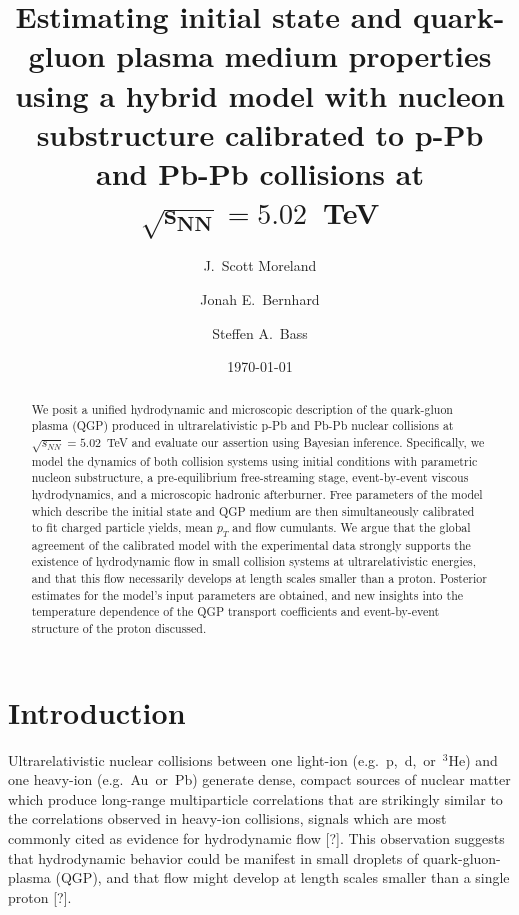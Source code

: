 \documentclass[aps,prc,reprint,amsmath,nofootinbib]{revtex4-1}
\newcommand{\sqrts}{\sqrt{s_{NN}}}
\newcommand{\note}{\textcolor{theblue}{[?]}}
\def\\#1{ #1}
\begin{document}
\title{
  Estimating initial state and quark-gluon plasma medium properties\\
  using a hybrid model with nucleon substructure\\
  calibrated to p-Pb and Pb-Pb collisions at \texorpdfstring{$\mathbf{\sqrts=5.02}$}{}~TeV
}

\author{J.\ Scott Moreland}
\author{Jonah E.\ Bernhard}
\author{Steffen A.\ Bass}


\date{\today}

\begin{abstract}
  We posit a unified hydrodynamic and microscopic description of the quark-gluon plasma (QGP) produced in ultrarelativistic p-Pb and Pb-Pb nuclear collisions at $\sqrts=5.02$~TeV and evaluate our assertion using Bayesian inference. Specifically, we model the dynamics of both collision systems using initial conditions with parametric nucleon substructure, a pre-equilibrium free-streaming stage, event-by-event viscous hydrodynamics, and a microscopic hadronic afterburner.
Free parameters of the model which describe the initial state and QGP medium are then simultaneously calibrated to fit charged particle yields, mean $p_T$ and flow cumulants.
We argue that the global agreement of the calibrated model with the experimental data strongly supports the existence of hydrodynamic flow in small collision systems at ultrarelativistic energies, and that this flow necessarily develops at length scales smaller than a proton.
Posterior estimates for the model's input parameters are obtained, and new insights into the temperature dependence of the QGP transport coefficients and event-by-event structure of the proton discussed.
\end{abstract}

\maketitle

\section{Introduction}

  Ultrarelativistic nuclear collisions between one light-ion \mbox{(e.g.\ p, d, or ${}^3$He)} and one heavy-ion \mbox{(e.g.\ Au or Pb)} generate dense, compact sources of nuclear matter which produce long-range multiparticle correlations that are strikingly similar to the correlations observed in heavy-ion collisions, signals which are most commonly cited as evidence for hydrodynamic flow \note.
This observation suggests that hydrodynamic behavior could be manifest in small droplets of quark-gluon-plasma (QGP), and that flow might develop at length scales smaller than a single proton \note.
\end{document}
